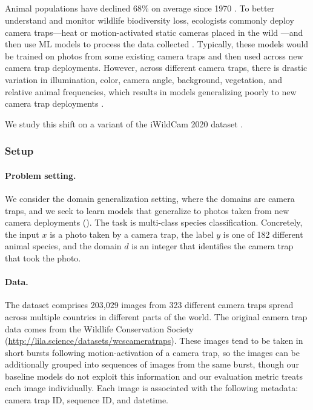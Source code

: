 \subsection{\iWildCam}\label{sec:app_iwildcam}

Animal populations have declined 68\% on average since 1970 \citep{grooten_peterson_almond}.
To better understand and monitor wildlife biodiversity loss, ecologists commonly deploy camera traps---heat or motion-activated static cameras placed in the wild \citep{wearn2017camera}---and then use ML models to process the data collected \citep{weinstein2018computer,norouzzadeh2019deep,tabak2019machine,beery2019efficient,ahumada2020wildlife}.
Typically, these models would be trained on photos from some existing camera traps and then used across new camera trap deployments.
However, across different camera traps, there is drastic variation in illumination, color, camera angle, background, vegetation, and relative animal frequencies,
which results in models generalizing poorly to new camera trap deployments \citep{beery2018recognition}.

We study this shift on a variant of the iWildCam 2020 dataset \citep{beery2020iwildcam}.

\subsubsection{Setup}
\paragraph{Problem setting.}
We consider the domain generalization setting, where the domains are camera traps, and we seek to learn models that generalize to photos taken from new camera deployments ().
The task is multi-class species classification.
Concretely, the input $x$ is a photo taken by a camera trap,
the label $y$ is one of 182 different animal species,
and the domain $d$ is an integer that identifies the camera trap that took the photo.

\paragraph{Data.}
The dataset comprises 203,029 images from 323 different camera traps spread across multiple countries in different parts of the world. The original camera trap data comes from the Wildlife Conservation Society (\url{http://lila.science/datasets/wcscameratraps}).
These images tend to be taken in short bursts following motion-activation of a camera trap, so the images can be additionally grouped into sequences of images from the same burst, though our baseline models do not exploit this information and our evaluation metric treats each image individually.
Each image is associated with the following metadata: camera trap ID, sequence ID, and datetime.


